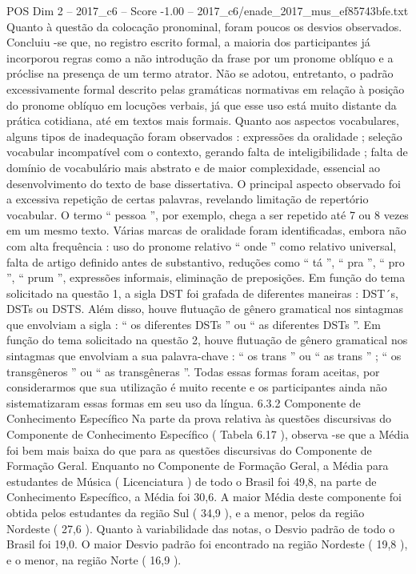 \begin{textsample}{POS Dim 2 – 2017\_c6 – Score -1.00 – 2017\_c6/enade\_2017\_mus\_ef85743bfe.txt}
Quanto à questão da colocação pronominal, foram poucos os desvios observados.
Concluiu -se que, no registro escrito formal, a maioria dos participantes já incorporou regras como a não introdução da frase por um pronome oblíquo e a próclise na presença de um termo atrator.
Não se adotou, entretanto, o padrão excessivamente formal descrito pelas gramáticas normativas em relação à posição do pronome oblíquo em locuções verbais, já que esse uso está muito distante da prática cotidiana, até em textos mais formais.
Quanto aos aspectos vocabulares, alguns tipos de inadequação foram observados : expressões da oralidade ; seleção vocabular incompatível com o contexto, gerando falta de inteligibilidade ; falta de domínio de vocabulário mais abstrato e de maior complexidade, essencial ao desenvolvimento do texto de base dissertativa.
O principal aspecto observado foi a excessiva repetição de certas palavras, revelando limitação de repertório vocabular.
O termo “ pessoa ”, por exemplo, chega a ser repetido até 7 ou 8 vezes em um mesmo texto.
Várias marcas de oralidade foram identificadas, embora não com alta frequência : uso do pronome relativo “ onde ” como relativo universal, falta de artigo definido antes de substantivo, reduções como “ tá ”, “ pra ”, “ pro ”, “ prum ”, expressões informais, eliminação de preposições.
Em função do tema solicitado na questão 1, a sigla DST foi grafada de diferentes maneiras : DST´s, DSTs ou DSTS.
Além disso, houve flutuação de gênero gramatical nos sintagmas que envolviam a sigla : “ os diferentes DSTs ” ou “ as diferentes DSTs ”.
Em função do tema solicitado na questão 2, houve flutuação de gênero gramatical nos sintagmas que envolviam a sua palavra-chave : “ os trans ” ou “ as trans ” ; “ os transgêneros ” ou “ as transgêneras ”.
Todas essas formas foram aceitas, por considerarmos que sua utilização é muito recente e os participantes ainda não sistematizaram essas formas em seu uso da língua. 6.3.2 Componente de Conhecimento Específico Na parte da prova relativa às questões discursivas do Componente de Conhecimento Específico ( Tabela 6.17 ), observa -se que a Média foi bem mais baixa do que para as questões discursivas do Componente de Formação Geral.
Enquanto no Componente de Formação Geral, a Média para estudantes de Música ( Licenciatura ) de todo o Brasil foi 49,8, na parte de Conhecimento Específico, a Média foi 30,6.
A maior Média deste componente foi obtida pelos estudantes da região Sul ( 34,9 ), e a menor, pelos da região Nordeste ( 27,6 ).
Quanto à variabilidade das notas, o Desvio padrão de todo o Brasil foi 19,0.
O maior Desvio padrão foi encontrado na região Nordeste ( 19,8 ), e o menor, na região Norte ( 16,9 ).

\end{textsample}
